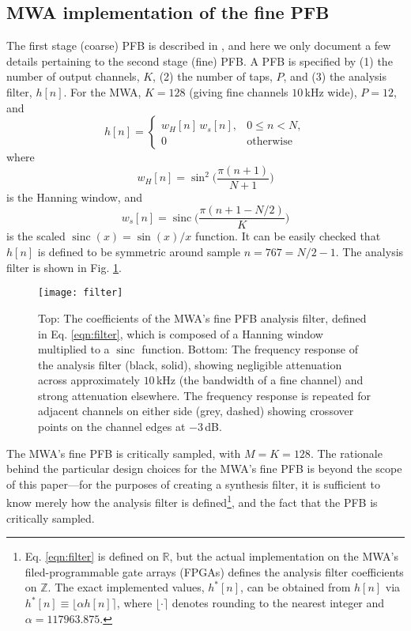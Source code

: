 \documentclass{pasa}%
\DeclareMathOperator{\sinc}{sinc}
\begin{document}
\subsection{MWA implementation of the fine PFB}

The first stage (coarse) PFB is described in \citet{Prabu2015}, and here we only document a few details pertaining to the second stage (fine) PFB.
A PFB is specified by (1) the number of output channels, $K$, (2) the number of taps, $P$, and (3) the analysis filter, $h[n]$.
For the MWA, $K = 128$ (giving fine channels $10\,$kHz wide), $P = 12$, and
\begin{equation}
    h[n] =
        \begin{cases}
            w_H[n]\,w_s[n], & 0 \le n < N, \\
            0               & \text{otherwise}
        \end{cases}
    \label{eqn:filter}
\end{equation}
where
\begin{equation*}
    w_H[n] = \sin^2\bigg(\frac{\pi (n+1)}{N+1}\bigg)
\end{equation*}
is the Hanning window, and
\begin{equation*}
    w_s[n] = \sinc\bigg(\frac{\pi(n + 1 - N/2)}{K}\bigg)
\end{equation*}
is the scaled $\sinc(x) = \sin(x)/x$ function.
It can be easily checked that $h[n]$ is defined to be symmetric around sample $n = 767 = N/2-1$.
The analysis filter is shown in Fig. \ref{fig:filter}.
\begin{figure}[t]
    \centering
    \texttt{[image: filter]}
    \caption{Top: The coefficients of the MWA's fine PFB analysis filter, defined in Eq. \eqref{eqn:filter}, which is composed of a Hanning window multiplied to a $\sinc$ function. Bottom: The frequency response of the analysis filter (black, solid), showing negligible attenuation across approximately $10\,$kHz (the bandwidth of a fine channel) and strong attenuation elsewhere. The frequency response is repeated for adjacent channels on either side (grey, dashed) showing crossover points on the channel edges at $-3\,$dB.}
    \label{fig:filter}
\end{figure}
The MWA's fine PFB is critically sampled, with $M = K = 128$.
The rationale behind the particular design choices for the MWA's fine PFB is beyond the scope of this paper---for the purposes of creating a synthesis filter, it is sufficient to know merely how the analysis filter is defined\footnote{Eq. \eqref{eqn:filter} is defined on $\mathbb{R}$, but the actual implementation on the MWA's filed-programmable gate arrays (FPGAs) defines the analysis filter coefficients on $\mathbb{Z}$. The exact implemented values, $h^\ast[n]$, can be obtained from $h[n]$ via $h^\ast[n] \equiv \lfloor\alpha h[n]\rceil$, where $\lfloor\cdot\rceil$ denotes rounding to the nearest integer and $\alpha = 117963.875$.}, and the fact that the PFB is critically sampled.
\end{document}
